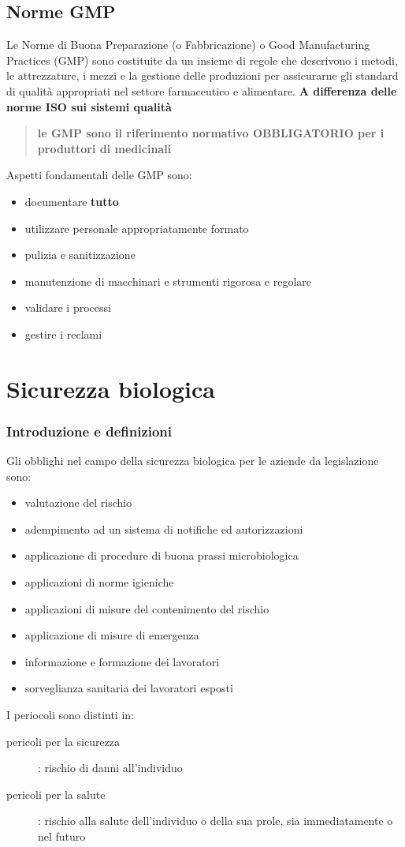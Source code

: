 \documentclass[a4paper]{article}
\begin{document}
\subsection{Norme GMP}
Le Norme di Buona Preparazione (o Fabbricazione) o Good Manufacturing Practices (GMP) sono costituite da
un insieme di regole che descrivono i metodi, le attrezzature, i mezzi e la gestione delle produzioni per
assicurarne gli standard di qualità appropriati nel settore farmaceutico e alimentare. \textbf{A differenza delle norme
ISO sui sistemi qualità}
\begin{quote}
    \centering
    \textbf{le GMP sono il riferimento normativo OBBLIGATORIO per i produttori di medicinali}
\end{quote}
Aspetti fondamentali delle GMP sono:
\begin{itemize}
    \item documentare \textbf{tutto}
    \item utilizzare personale appropriatamente formato
    \item pulizia e sanitizzazione
    \item manutenzione di macchinari e strumenti rigorosa e regolare
    \item validare i processi
    \item gestire i reclami
\end{itemize}
\section{Sicurezza biologica}
\subsubsection{Introduzione e definizioni}
Gli obblighi nel campo della sicurezza biologica per le aziende da legislazione sono:
\begin{itemize}
    \item valutazione del rischio
    \item adempimento ad un sistema di notifiche ed autorizzazioni
    \item applicazione di procedure di buona prassi microbiologica
    \item applicazioni di norme igieniche
    \item applicazioni di misure del contenimento del rischio
    \item applicazione di misure di emergenza
    \item informazione e formazione dei lavoratori
    \item sorveglianza sanitaria dei lavoratori esposti
\end{itemize}
I periocoli sono distinti in:
\begin{description}
    \item[pericoli per la sicurezza]: rischio di danni all'individuo
    \item[pericoli per la salute]: rischio alla salute dell'individuo o della sua prole, sia immediatamente o nel futuro
\end{description}
\end{document}
